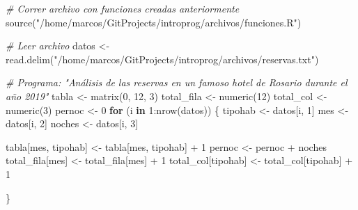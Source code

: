 \documentclass[
]{book}
\newenvironment{Shaded}{\begin{snugshade}}{\end{snugshade}}
\newcommand{\CommentTok}[1]{\textcolor[rgb]{0.56,0.35,0.01}{\textit{#1}}}
\newcommand{\ControlFlowTok}[1]{\textcolor[rgb]{0.13,0.29,0.53}{\textbf{#1}}}
\newcommand{\DecValTok}[1]{\textcolor[rgb]{0.00,0.00,0.81}{#1}}
\newcommand{\FunctionTok}[1]{\textcolor[rgb]{0.00,0.00,0.00}{#1}}
\newcommand{\NormalTok}[1]{#1}
\newcommand{\OtherTok}[1]{\textcolor[rgb]{0.56,0.35,0.01}{#1}}
\newcommand{\SpecialCharTok}[1]{\textcolor[rgb]{0.00,0.00,0.00}{#1}}
\newcommand{\StringTok}[1]{\textcolor[rgb]{0.31,0.60,0.02}{#1}}
\begin{document}
\begin{Shaded}
\begin{Highlighting}[]
\CommentTok{\# Correr archivo con funciones creadas anteriormente}
\FunctionTok{source}\NormalTok{(}\StringTok{"/home/marcos/GitProjects/introprog/archivos/funciones.R"}\NormalTok{)}

\CommentTok{\# Leer archivo}
\NormalTok{datos }\OtherTok{\textless{}{-}} \FunctionTok{read.delim}\NormalTok{(}\StringTok{"/home/marcos/GitProjects/introprog/archivos/reservas.txt"}\NormalTok{)}

\CommentTok{\# Programa: "Análisis de las reservas en un famoso hotel de Rosario durante el año 2019"}
\NormalTok{tabla }\OtherTok{\textless{}{-}} \FunctionTok{matrix}\NormalTok{(}\DecValTok{0}\NormalTok{, }\DecValTok{12}\NormalTok{, }\DecValTok{3}\NormalTok{)}
\NormalTok{total\_fila }\OtherTok{\textless{}{-}} \FunctionTok{numeric}\NormalTok{(}\DecValTok{12}\NormalTok{)}
\NormalTok{total\_col }\OtherTok{\textless{}{-}} \FunctionTok{numeric}\NormalTok{(}\DecValTok{3}\NormalTok{)}
\NormalTok{pernoc }\OtherTok{\textless{}{-}} \DecValTok{0}
\ControlFlowTok{for}\NormalTok{ (i }\ControlFlowTok{in} \DecValTok{1}\SpecialCharTok{:}\FunctionTok{nrow}\NormalTok{(datos)) \{}
\NormalTok{    tipohab }\OtherTok{\textless{}{-}}\NormalTok{ datos[i, }\DecValTok{1}\NormalTok{]}
\NormalTok{    mes }\OtherTok{\textless{}{-}}\NormalTok{ datos[i, }\DecValTok{2}\NormalTok{]}
\NormalTok{    noches }\OtherTok{\textless{}{-}}\NormalTok{ datos[i, }\DecValTok{3}\NormalTok{]}
    
\NormalTok{    tabla[mes, tipohab] }\OtherTok{\textless{}{-}}\NormalTok{ tabla[mes, tipohab] }\SpecialCharTok{+} \DecValTok{1}
\NormalTok{    pernoc }\OtherTok{\textless{}{-}}\NormalTok{ pernoc }\SpecialCharTok{+}\NormalTok{ noches}
\NormalTok{    total\_fila[mes] }\OtherTok{\textless{}{-}}\NormalTok{ total\_fila[mes] }\SpecialCharTok{+} \DecValTok{1}
\NormalTok{    total\_col[tipohab] }\OtherTok{\textless{}{-}}\NormalTok{ total\_col[tipohab] }\SpecialCharTok{+} \DecValTok{1}
    
\NormalTok{\}}


\end{Highlighting}
\end{Shaded}
\end{document}
